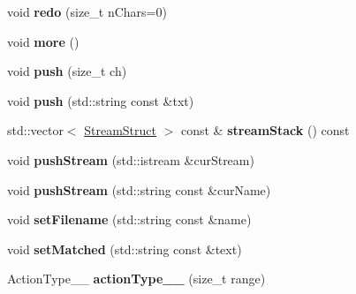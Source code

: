 \begin{DoxyCompactItemize}
\item 
\hypertarget{classScannerBase_ae1cdca0b7158f331448e744496ef2ccd}{void {\bfseries redo} (size\+\_\+t n\+Chars=0)}\label{classScannerBase_ae1cdca0b7158f331448e744496ef2ccd}

\item 
\hypertarget{classScannerBase_aac0eac4274996b1dbe96c25b7a72c291}{void {\bfseries more} ()}\label{classScannerBase_aac0eac4274996b1dbe96c25b7a72c291}

\item 
\hypertarget{classScannerBase_aaac7ba2745723f9c32fe73be62ccabe7}{void {\bfseries push} (size\+\_\+t ch)}\label{classScannerBase_aaac7ba2745723f9c32fe73be62ccabe7}

\item 
\hypertarget{classScannerBase_a560981768e4742beca13cd499ac2aee6}{void {\bfseries push} (std\+::string const \&txt)}\label{classScannerBase_a560981768e4742beca13cd499ac2aee6}

\item 
\hypertarget{classScannerBase_a6f27a6435c98c739507207f17e71bc86}{std\+::vector$<$ \hyperlink{structScannerBase_1_1StreamStruct}{Stream\+Struct} $>$ const \& {\bfseries stream\+Stack} () const }\label{classScannerBase_a6f27a6435c98c739507207f17e71bc86}

\item 
\hypertarget{classScannerBase_a7a5b3ba90f7c325382b7e8b740f68b84}{void {\bfseries push\+Stream} (std\+::istream \&cur\+Stream)}\label{classScannerBase_a7a5b3ba90f7c325382b7e8b740f68b84}

\item 
\hypertarget{classScannerBase_abd859aa5cf970c528f9619e4a7dcdd3d}{void {\bfseries push\+Stream} (std\+::string const \&cur\+Name)}\label{classScannerBase_abd859aa5cf970c528f9619e4a7dcdd3d}

\item 
\hypertarget{classScannerBase_abef7b7162ed50674ceb6e8ea97997ecd}{void {\bfseries set\+Filename} (std\+::string const \&name)}\label{classScannerBase_abef7b7162ed50674ceb6e8ea97997ecd}

\item 
\hypertarget{classScannerBase_a255420f4d51d5ffcb8c6a2447e92b4db}{void {\bfseries set\+Matched} (std\+::string const \&text)}\label{classScannerBase_a255420f4d51d5ffcb8c6a2447e92b4db}

\item 
\hypertarget{classScannerBase_a22a9d4fa2238f4e805943f8fe8f771db}{Action\+Type\+\_\+\+\_\+ {\bfseries action\+Type\+\_\+\+\_\+} (size\+\_\+t range)}\label{classScannerBase_a22a9d4fa2238f4e805943f8fe8f771db}


\end{DoxyCompactItemize}
